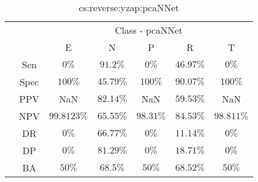 \begin{table}[!ht]
	\centering
	\begin{tabular}{|c|c|c|c|c|c|c|}
		\cline{3-7}
		\multicolumn{2}{c|}{} & \multicolumn{5}{c|}{Class - pcaNNet} \\ \cline{3-7}
		\multicolumn{2}{c|}{} & E & N & P & R & T \\ \hline
		\multirow{7}{*}{\rotatebox{90}{Statistics}} & Sen & $0\%$ & $91.2\%$ & $0\%$ & $46.97\%$ & $0\%$ \\ \cline{2-7}
		 & Spec & $100\%$ & $45.79\%$ & $100\%$ & $90.07\%$ & $100\%$ \\ \cline{2-7}
		 & PPV & NaN & $82.14\%$ & NaN & $59.53\%$ & NaN \\ \cline{2-7}
		 & NPV & $99.8123\%$ & $65.55\%$ & $98.31\%$ & $84.53\%$ & $98.811\%$ \\ \cline{2-7}
		 & DR & $0\%$ & $66.77\%$ & $0\%$ & $11.14\%$ & $0\%$ \\ \cline{2-7}
		 & DP & $0\%$ & $81.29\%$ & $0\%$ & $18.71\%$ & $0\%$ \\ \cline{2-7}
		 & BA & $50\%$ & $68.5\%$ & $50\%$ & $68.52\%$ & $50\%$ \\ \hline
	\end{tabular}
	\caption{cs:reverse:yzap:pcaNNet}
	\label{tab:cs:reverse:yzap:pcaNNet}
\end{table}
